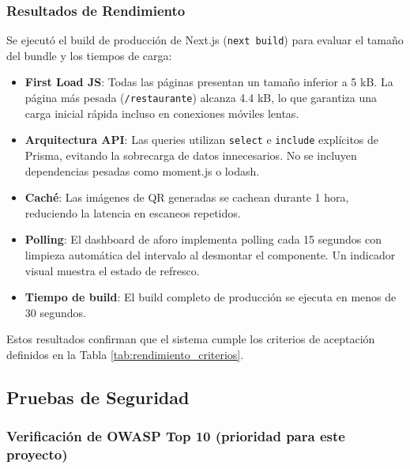 \subsubsection{Resultados de Rendimiento}

Se ejecutó el build de producción de Next.js (\texttt{next build}) para evaluar el tamaño del bundle y los tiempos de carga:

\begin{itemize}
    \item \textbf{First Load JS}: Todas las páginas presentan un tamaño inferior a 5 kB. La página más pesada (\texttt{/restaurante}) alcanza 4.4 kB, lo que garantiza una carga inicial rápida incluso en conexiones móviles lentas.
    \item \textbf{Arquitectura API}: Las queries utilizan \texttt{select} e \texttt{include} explícitos de Prisma, evitando la sobrecarga de datos innecesarios. No se incluyen dependencias pesadas como moment.js o lodash.
    \item \textbf{Caché}: Las imágenes de QR generadas se cachean durante 1 hora, reduciendo la latencia en escaneos repetidos.
    \item \textbf{Polling}: El dashboard de aforo implementa polling cada 15 segundos con limpieza automática del intervalo al desmontar el componente. Un indicador visual muestra el estado de refresco.
    \item \textbf{Tiempo de build}: El build completo de producción se ejecuta en menos de 30 segundos.
\end{itemize}

Estos resultados confirman que el sistema cumple los criterios de aceptación definidos en la Tabla \ref{tab:rendimiento_criterios}.

\subsection{Pruebas de Seguridad}

\subsubsection{Verificación de OWASP Top 10 (prioridad para este proyecto)}

